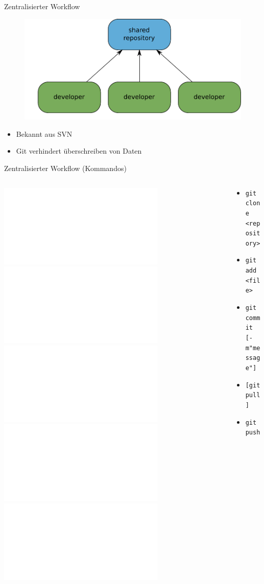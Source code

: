 \begin{frame}{Zentralisierter Workflow}
\begin{figure} 
\centering
\includegraphics[scale=0.6]{images/centralized/centralized-workflow.pdf}
\end{figure}
\begin{itemize}
\pause \item Bekannt aus SVN
\pause \item Git verhindert überschreiben von Daten
\end{itemize}
\end{frame}

\begin{frame}{Zentralisierter Workflow (Kommandos)}
\begin{columns}[T]
  \begin{column}{.5\textwidth}
    \begin{block}{}  
		\includegraphics<1>[scale=0.4]{images/centralized/centralized-workflow-clone.pdf}
		\includegraphics<2>[scale=0.4]{images/centralized/centralized-workflow-work.pdf}
		\includegraphics<3>[scale=0.4]{images/centralized/centralized-workflow-conflict.pdf}
		\includegraphics<4>[scale=0.4]{images/centralized/centralized-workflow-clone.pdf}
		\includegraphics<5>[scale=0.4]{images/centralized/centralized-workflow-push.pdf}
    \end{block}
  \end{column}
  \begin{column}{.5\textwidth}
    \begin{block}{}
    	\begin{tiny}
		\begin{itemize}
		  \item \texttt{git clone <repository>}
  		  \pause \item \texttt{git add <file>}
  		  \item \texttt{git commit [-m"message"]}
  		  \pause
		  \pause \item \texttt{[git pull]}
  		  \pause \item \texttt{git push}
		\end{itemize}
    	\end{tiny}		
    \end{block}
  \end{column}
\end{columns}  
\end{frame}

